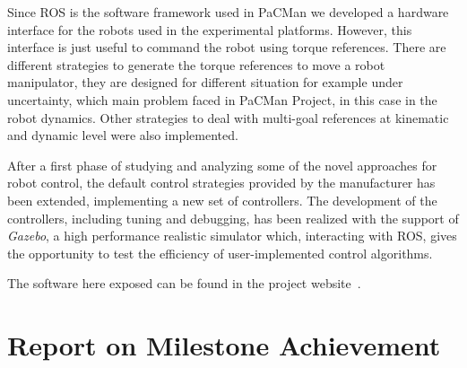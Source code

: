 \documentclass[a4paper,11pt,pdf]{pacmanreport}
\begin{document}
Since ROS is the software framework used in PaCMan we developed a hardware interface for the robots used in the experimental platforms. However, this interface is just useful to command the robot using torque references. There are different strategies to generate the torque references to move a robot manipulator, they are designed for different situation for example under uncertainty, which main problem faced in PaCMan Project, in this case in the robot dynamics. Other strategies to deal with multi-goal references at kinematic and dynamic level were also implemented.




After a first phase of studying and analyzing some of the novel approaches for robot control, the default control strategies provided by the manufacturer has been extended, implementing a new set of controllers.
The development of the controllers, including tuning and debugging, has been realized with the support of \textit{Gazebo}, a high performance realistic simulator which, interacting with ROS, gives the opportunity to test the efficiency of user-implemented control algorithms. 


The software here exposed can be found in the project website~\cite{PACMAN_software}.

\section{Report on Milestone Achievement}












\end{document}
